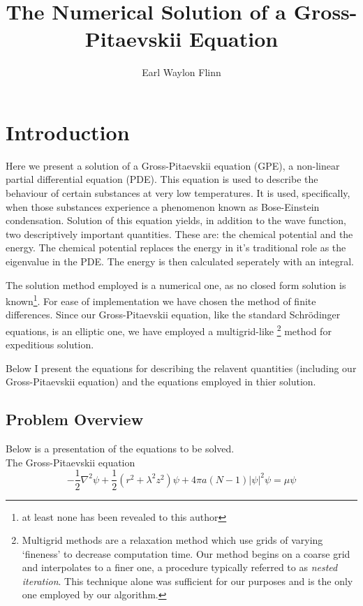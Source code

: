 \documentclass{article}
\title{The Numerical Solution of a Gross-Pitaevskii Equation}
\author{Earl Waylon Flinn}
\begin{document}
\maketitle
\section{Introduction}
Here we present a solution of a Gross-Pitaevskii equation (GPE), a non-linear
partial differential equation (PDE). This equation is
used to describe the behaviour of certain substances at very low temperatures.
It is used, specifically, when those substances experience a phenomenon known
as Bose-Einstein condensation. Solution of this equation yields, in addition to
the wave function, two descriptively important quantities. These are: the
chemical potential and the energy. The chemical potential replaces the energy
in it's traditional role as the eigenvalue in the PDE. The energy is then
calculated seperately with an integral.

The solution method employed is a numerical one, as no closed form solution is
known\footnote{at least none has been revealed to this author}. For ease of
implementation we have chosen the method of finite differences. Since our
Gross-Pitaevskii equation, like the standard Schr\"odinger
equations, is an elliptic one, we have employed a multigrid-like
\footnote{Multigrid methods are a relaxation method which use grids of varying
`fineness' to decrease computation time. Our method begins on a coarse grid and
interpolates to a finer one, a procedure typically referred to as
\emph{nested iteration}. This technique alone was sufficient for our purposes
and is the only one employed by our algorithm.} method for expeditious solution.


Below I present the equations for describing the relavent quantities (including
our Gross-Pitaevskii equation) and the equations employed in thier solution.

\subsection{Problem Overview}
Below is a presentation of the equations to be solved.\\

The Gross-Pitaevskii equation
\begin{equation}
- \frac{1}{2}  \nabla^{2} \psi +
\frac{1}{2} \left( r^{2} + \lambda^{2} z^{2} \right) \psi +
4 \pi a (N-1) \lvert \psi \rvert^{2} \psi = 
\mu \psi
\end{equation}
\end{document}
